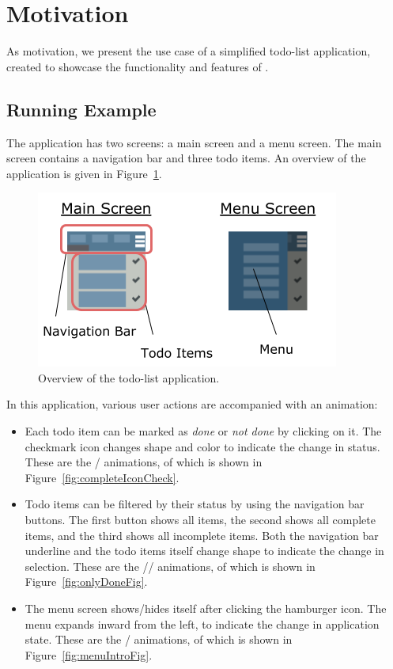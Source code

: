 \section{Motivation}
\label{sec:motivation}

As motivation, we present the use case of a simplified todo-list application, created to showcase the functionality and features of \dsl{}.

\subsection{Running Example}

The application has two screens: a main screen and a menu screen. The main screen contains a navigation bar and three todo items. An overview of the application is given in Figure~\ref{fig:appOverview}.

\begin{figure}[!htbp]
\centering
\includegraphics[width=\figscale\textwidth]{pictures/app_overview}
\caption{Overview of the todo-list application.}
\label{fig:appOverview}
\end{figure}

In this application, various user actions are accompanied with an animation:
\begin{itemize}
\item Each todo item can be marked as \emph{done} or \emph{not done} by clicking on it. The checkmark icon changes shape and color to indicate the change in status. These are the / animations, of which  is shown in Figure~\ref{fig:completeIconCheck}.
\item Todo items can be filtered by their status by using the navigation bar buttons. The first button shows all items, the second shows all complete items, and the third shows all incomplete items. Both the navigation bar underline and the todo items itself change shape to indicate the change in selection. These are the // animations, of which  is shown in Figure~\ref{fig:onlyDoneFig}.
\item The menu screen shows/hides itself after clicking the hamburger icon. The menu expands inward from the left, to indicate the change in application state. These are the / animations, of which  is shown in Figure~\ref{fig:menuIntroFig}.
\end{itemize}

